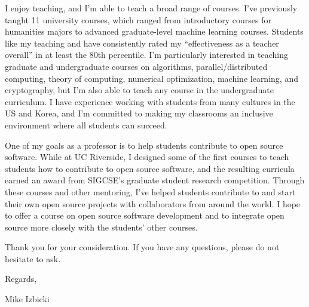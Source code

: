 \documentclass[12pt]{article}
\newcommand{\school}[2]{\textcolor{red}{\textbf{{#1}:} {#2}}}
\begin{document}
\noindent
I enjoy teaching,
and I'm able to teach a broad range of courses.
I've previously taught 11 university courses,
which ranged from introductory courses for humanities majors to advanced graduate-level machine learning courses.
Students like my teaching and have consistently rated my ``effectiveness as a teacher overall'' in at least the 80th percentile.
I'm particularly interested in teaching graduate and undergraduate courses on algorithms, parallel/distributed computing, theory of computing, numerical optimization, machine learning, and cryptography,
but I'm also able to teach any course in the undergraduate curriculum.
I have experience working with students from many cultures in the US and Korea,
and I'm committed to making my classrooms an inclusive environment where all students can succeed.

\noindent
One of my goals as a professor is to help students contribute to open source software.
While at UC Riverside, I designed some of the first courses to teach students how to contribute to open source software,
and the resulting curricula earned an award from SIGCSE's graduate student research competition.
Through these courses and other mentoring, 
I've helped students contribute to and start their own open source projects with collaborators from around the world.
I hope to offer a course on open source software development
and to integrate open source more closely with the students' other courses.

\noindent
Thank you for your consideration.
If you have any questions,
please do not hesitate to ask.

\noindent
Regards,

\vspace{-0.10in}
\noindent
Mike Izbicki

%
%
%
%
%
\end{document}
